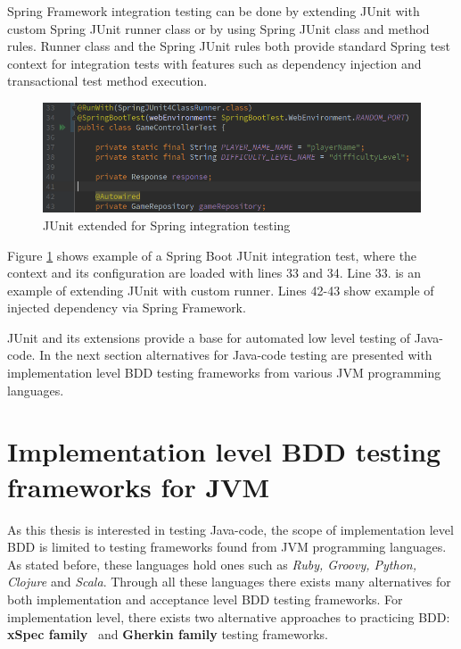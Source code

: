     Spring Framework integration testing can be done by extending JUnit with custom Spring JUnit runner class or by using Spring JUnit class and
    method rules. Runner class and the Spring JUnit rules both provide standard Spring test context
    for integration tests with features such as dependency injection and transactional test method execution. ~\cite{springintegration}

    \begin{figure}[ht]
      \begin{center}
        \includegraphics[width=13.5cm]{images/springrunner.png}
        \caption{JUnit extended for Spring integration testing}
        \label{fig:springrunner}
      \end{center}
    \end{figure}

    Figure \ref{fig:springrunner} shows example of a Spring Boot JUnit integration test, where the context and its configuration are
    loaded with lines 33 and 34. Line 33. is an example of extending JUnit with custom runner. Lines 42-43 show example of injected dependency
    via Spring Framework.

    JUnit and its extensions provide a base for automated low level testing of Java-code.
    In the next section alternatives for Java-code testing are presented with implementation level BDD testing frameworks from
    various JVM programming languages.

\section{Implementation level BDD testing frameworks for JVM}
    As this thesis is interested in testing Java-code, the scope of implementation level BDD is limited to testing frameworks
    found from JVM programming languages. As stated before, these languages hold ones such as \textit{Ruby, Groovy, Python,
    Clojure} and \textit{Scala}. Through all these languages there exists many alternatives for both implementation and
    acceptance level BDD testing frameworks. For implementation level, there exists two alternative approaches to practicing
    BDD: \textbf{xSpec family}~\cite{solis2011study} and \textbf{Gherkin family} testing frameworks.

